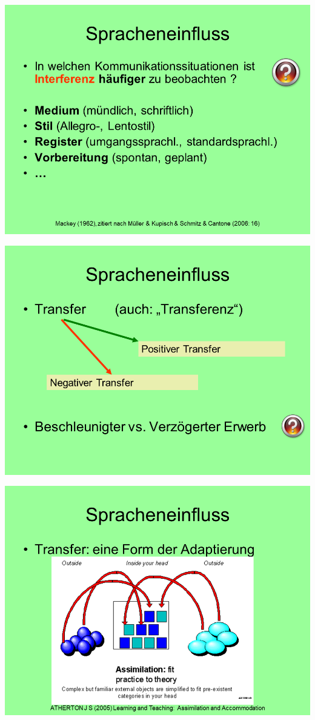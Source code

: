 \documentclass[
  letterpaper,
]{scrbook}
\begin{document}
\includegraphics[width=1\textwidth,height=\textheight]{./pictures/02_Spracheneinfluss_Sprachentrennung/Diapozitiv19.PNG}

\includegraphics[width=1\textwidth,height=\textheight]{./pictures/02_Spracheneinfluss_Sprachentrennung/Diapozitiv20.PNG}

\includegraphics[width=1\textwidth,height=\textheight]{./pictures/02_Spracheneinfluss_Sprachentrennung/Diapozitiv21.PNG}
\end{document}
